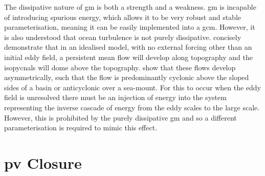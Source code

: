 \documentclass[12pt,a4paper]{report}
\begin{document}
        The dissipative nature of \gls{gm} is both a strength and a
         weakness. \gls{gm} is incapable of introducing spurious energy,
         which allows it to be very robust and stable
         parameterisation, meaning it can be easily implemented 
         into a \gls{gcm}. However, it is also understood that
         ocean turbulence is not purely dissipative.
          \cite{adcock2000interactions} concisely demonstrate that
         in an idealised model, with no external forcing other
         than an initial eddy field, a persistent mean flow will develop along
         topography and the isopycnals will dome above the topography.
          \cite{nost2008asymmetry} show that these
         flows develop asymmetrically, such that the flow is 
         predominantly cyclonic above the sloped sides of
         a basin or anticyclonic over a sea-mount. For this to occur 
         when the eddy field is unresolved there must be an 
         injection of energy into the system representing the 
         inverse cascade of energy from the eddy scales to the large scale.
         However, this is prohibited by the purely dissipative \gls{gm}
         and so a different parameterisation is required to mimic this
         effect.
         
         
         
         \section{\gls{pv} Closure}
         
\end{document}
